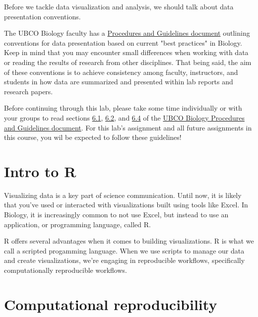 \documentclass[
]{book}
\begin{document}
Before we tackle data visualization and analysis, we should talk about data presentation conventions.

The UBCO Biology faculty has a \href{https://ubco-biology.github.io/Procedures-and-Guidelines/figures-tables.html}{Procedures and Guidelines document} outlining conventions for data presentation based on current "best practices" in Biology. Keep in mind that you may encounter small differences when working with data or reading the results of research from other disciplines. That being said, the aim of these conventions is to achieve consistency among faculty, instructors, and students in how data are summarized and presented within lab reports and research papers.

Before continuing through this lab, please take some time individually or with your groups to read sections \href{https://ubco-biology.github.io/Procedures-and-Guidelines/tables.html}{6.1}, \href{https://ubco-biology.github.io/Procedures-and-Guidelines/descriptive-summary-statistics.html}{6.2}, and \href{https://ubco-biology.github.io/Procedures-and-Guidelines/figures.html}{6.4} of the \href{https://ubco-biology.github.io/Procedures-and-Guidelines/figures-tables.html}{UBCO Biology Procedures and Guidelines document}. For this lab's assignment and all future assignments in this course, you wil be expected to follow these guidelines!

\hypertarget{intro-to-r}{%
\chapter*{Intro to R}\label{intro-to-r}}

Visualizing data is a key part of science communication. Until now, it is likely that you've used or interacted with visualizations built using tools like Excel. In Biology, it is increasingly common to not use Excel, but instead to use an application, or programming language, called R.

R offers several advantages when it comes to building visualizations. R is what we call a scripted progamming language. When we use scripts to manage our data and create visualizations, we're engaging in reproducible workflows, specifically computationally reproducible workflows.

\hypertarget{computational-reproducibility}{%
\chapter*{Computational reproducibility}\label{computational-reproducibility}}
\end{document}
